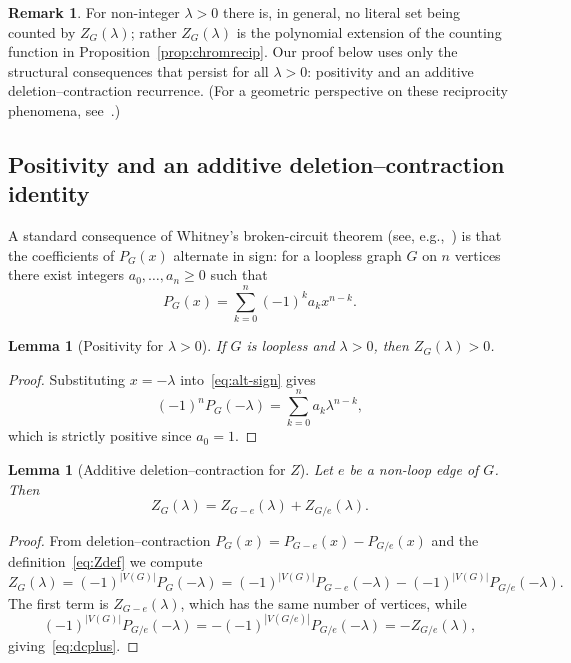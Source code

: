 \documentclass[A4paper,reqno,oneside,12pt]{amsart}
\theoremstyle{plain}
\newtheorem{lemma}[theorem]{Lemma}
\theoremstyle{definition}
\newtheorem{remark}[theorem]{Remark}
\begin{document}
\begin{remark}\label{rem:noninteger}
For non-integer $\lambda>0$ there is, in general, no literal set being counted by $Z_G(\lambda)$; rather $Z_G(\lambda)$ is the polynomial extension of the counting function in Proposition~\ref{prop:chromrecip}.
Our proof below uses only the structural consequences that persist for all $\lambda>0$: positivity and an additive deletion--contraction recurrence.
(For a geometric perspective on these reciprocity phenomena, see~\cite{BeckZaslavskyInsideOut}.)
\end{remark}

\subsection{Positivity and an additive deletion--contraction identity}

A standard consequence of Whitney's broken-circuit theorem (see, e.g.,~\cite{StanleyEC1}) is that the coefficients of $P_G(x)$ alternate in sign:
for a loopless graph $G$ on $n$ vertices there exist integers $a_0,\dots,a_n\ge 0$ such that
\begin{equation}\label{eq:alt-sign}
P_G(x)=\sum_{k=0}^n (-1)^k a_k x^{n-k}.
\end{equation}

\begin{lemma}[Positivity for $\lambda>0$]\label{lem:Zpositive}
If $G$ is loopless and $\lambda>0$, then $Z_G(\lambda)>0$.
\end{lemma}

\begin{proof}
Substituting $x=-\lambda$ into~\eqref{eq:alt-sign} gives
\[
(-1)^n P_G(-\lambda)=\sum_{k=0}^n a_k \lambda^{n-k},
\]
which is strictly positive since $a_0=1$.
\end{proof}

\begin{lemma}[Additive deletion--contraction for $Z$]\label{lem:dcplus}
Let $e$ be a non-loop edge of $G$. Then
\begin{equation}\label{eq:dcplus}
Z_G(\lambda)=Z_{G-e}(\lambda)+Z_{G/e}(\lambda).
\end{equation}
\end{lemma}

\begin{proof}
From deletion--contraction $P_G(x)=P_{G-e}(x)-P_{G/e}(x)$ and the definition~\eqref{eq:Zdef} we compute
\[
Z_G(\lambda)
=
(-1)^{|V(G)|}P_G(-\lambda)
=
(-1)^{|V(G)|}P_{G-e}(-\lambda)-(-1)^{|V(G)|}P_{G/e}(-\lambda).
\]
The first term is $Z_{G-e}(\lambda)$, which has the same number of vertices, while
$$(-1)^{|V(G)|}P_{G/e}(-\lambda)=-(-1)^{|V(G/e)|}P_{G/e}(-\lambda)=-Z_{G/e}(\lambda),$$
giving~\eqref{eq:dcplus}.
\end{proof}
\end{document}
